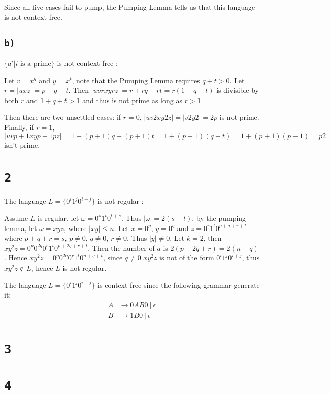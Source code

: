 \documentclass[a4paper,11pt]{report}
\begin{document}
Since all five cases fail to pump, the Pumping Lemma tells us that this language
is not context-free.

\subsection*{\texttt{b)}}

$\{a^i | i \text{ is a prime} \}$ is not context-free :

Let $v=x^q$ and $y = x^t$, note that the Pumping Lemma requires $q+t>0$. Let
$r=|uxz|=p−q−t$. Then $|uvrxyrz|=r+rq+rt=r(1+q+t)$ is divisible by both $r$ and
$1+q+t>1$ and thus is not prime as long as $r>1$.

Then there are two unsettled cases: if $r=0$, $|uv2xy2z|=|v2y2|=2p$ is not
prime. Finally, if $r=1$,
$|uvp+1xyp+1pz|=1+(p+1)q+(p+1)t=1+(p+1)(q+t)=1+(p+1)(p−1)=p2$ isn't prime.

\section*{\texttt{2}}

The language $L = \{0^i1^j0^{i+j}\}$ is not regular :

Assume $L$ is regular, let $\omega = 0^s1^t0^{t+s}$. Thus $|\omega| = 2(s+t)$,
by the pumping lemma, let $\omega = xyz$, where $|xy| \leq n$. Let $x = 0^p$, $y
= 0^q$ and $z = 0^r1^t0^{p+q+r+t}$ where $p + q + r = s$, $p \neq 0$, $q \neq
0$, $r \neq 0$. Thus $|y| \neq 0$. Let $k = 2$, then $xy^2z =
0^p0^{2q}0^r1^t0^{p+2q+r+t}$. Then the number of $a$ is $2(p + 2q + r) = 2(n +
q)$. Hence $xy^2z = 0^p0^{2q}0^r1^t0^{n+q+t}$, since $q \neq 0$ $xy^2z$ is not
of the form $0^i1^j0^{i+j}$, thus $xy^2z \not\in L$, hence $L$ is not regular.

The language $L = \{0^i1^j0^{i+j}\}$ is context-free since the following grammar
generate it:
\begin{align*}
  A &\to 0AB0\ |\ \epsilon \\
  B &\to 1B0\ |\ \epsilon
\end{align*}

\section*{\texttt{3}}

\section*{\texttt{4}}
\end{document}

